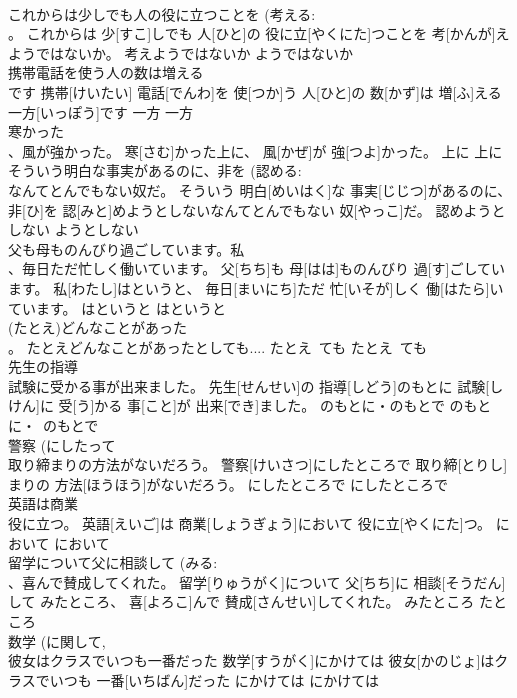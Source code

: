 \documentclass[8pt]{extreport}
\begin{document}
\begin{CJK}{UTF8}{min}
\\	これからは少しでも人の役に立つことを (考える: 
\\	。	これからは 少[すこ]しでも 人[ひと]の 役に立[やくにた]つことを 考[かんが]えようではないか。	考えようではないか	ようではないか	
\\	携帯電話を使う人の数は増える 
\\	です	携帯[けいたい] 電話[でんわ]を 使[つか]う 人[ひと]の 数[かず]は 増[ふ]える 一方[いっぽう]です	一方	一方	
\\	寒かった 
\\	、風が強かった。	寒[さむ]かった上に、 風[かぜ]が 強[つよ]かった。	上に	上に	
\\	そういう明白な事実があるのに、非を (認める: 
\\	なんてとんでもない奴だ。	そういう 明白[めいはく]な 事実[じじつ]があるのに、 非[ひ]を 認[みと]めようとしないなんてとんでもない 奴[やっこ]だ。	認めようとしない	ようとしない	
\\	父も母ものんびり過ごしています。私 
\\	、毎日ただ忙しく働いています。	父[ちち]も 母[はは]ものんびり 過[す]ごしています。 私[わたし]はというと、 毎日[まいにち]ただ 忙[いそが]しく 働[はたら]いています。	はというと	はというと	
\\	(たとえ)どんなことがあった 
\\	。	たとえどんなことがあったとしても....	たとえ~ても	たとえ~ても	
\\	先生の指導 
\\	試験に受かる事が出来ました。	先生[せんせい]の 指導[しどう]のもとに 試験[しけん]に 受[う]かる 事[こと]が 出来[でき]ました。	のもとに・のもとで	のもとに・~のもとで	
\\	警察 (にしたって 
\\	取り締まりの方法がないだろう。	警察[けいさつ]にしたところで 取り締[とりし]まりの 方法[ほうほう]がないだろう。	にしたところで	にしたところで	
\\	英語は商業 
\\	役に立つ。	英語[えいご]は 商業[しょうぎょう]において 役に立[やくにた]つ。	において	において	
\\	留学について父に相談して (みる: 
\\	、喜んで賛成してくれた。	留学[りゅうがく]について 父[ちち]に 相談[そうだん]して みたところ、 喜[よろこ]んで 賛成[さんせい]してくれた。	みたところ	たところ	
\\	数学 (に関して, 
\\	彼女はクラスでいつも一番だった	数学[すうがく]にかけては 彼女[かのじょ]はクラスでいつも 一番[いちばん]だった	にかけては	にかけては	

\end{CJK}
\end{document}
